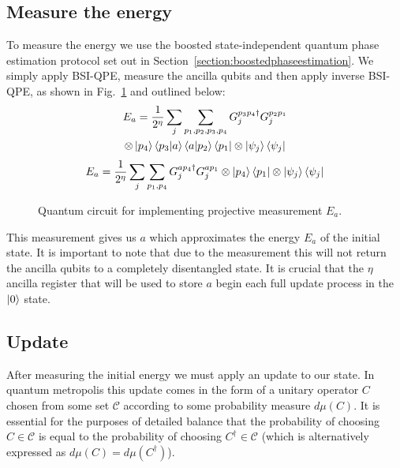 \documentclass[aps,floatfix,10pt,amssymb,amsfont,amsmath,superscriptaddress,float,nofootinbib,longbibliography,nobalancelastpage,twocolumn]{revtex4-2}
\begin{document}
\subsection{Measure the energy}
\label{section:energymeasurement}
To measure the energy we use the boosted state-independent quantum phase estimation protocol set out in Section~\ref{section:boostedphaseestimation}. We simply apply BSI-QPE, measure the ancilla qubits and then apply inverse BSI-QPE, as shown in Fig.~\ref{fig:Ecircuit} and outlined below:
\begin{multline}
    E_a = \frac{1}{2^{\eta}}\sum_j\sum_{p_1,p_2,p_3,p_4} G_j^{p_3p_4 \dagger}G_j^{p_2p_1}\\\otimes\ket{p_4}\braket{p_3|a}\braket{a|p_2}\bra{p_1}\otimes\ket{\psi_j}\bra{\psi_j}
\end{multline}
\begin{equation}
        E_a = \frac{1}{2^{\eta}}\sum_j\sum_{p_1,p_4} G_j^{ap_4 \dagger}G_j^{ap_1}\otimes\ket{p_4}\bra{p_1}\otimes\ket{\psi_j}\bra{\psi_j}
\end{equation}
\begin{figure}

\caption{Quantum circuit for implementing projective measurement $E_a$. }
\label{fig:Ecircuit}
\end{figure}
This measurement gives us $a$ which approximates the energy $E_a$ of the initial state. It is important to note that due to the measurement this will not return the ancilla qubits to a completely disentangled state. It is crucial that the $\eta$ ancilla register that will be used to store $a$ begin each full update process in the $\ket{0}$ state. 
\subsection{Update}
\label{section:update}
After measuring the initial energy we must apply an update to our state. In quantum metropolis this update comes in the form of a unitary operator $C$ chosen from some set $\mathcal{C}$ according to some probability measure $d\mu(C)$. It is essential for the purposes of detailed balance that the probability of choosing $C \in \mathcal{C}$ is equal to the probability of choosing $C^{\dagger} \in \mathcal{C}$ (which is alternatively expressed as $d\mu(C) = d\mu(C^{\dagger})$).
\end{document}
